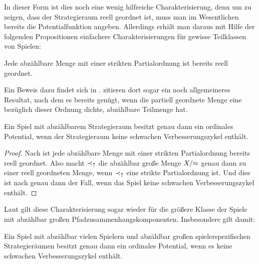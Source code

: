 In dieser Form ist dies noch eine wenig hilfreiche Charakterisierung, denn um zu zeigen, dass der Strategieraum reell geordnet ist, muss man im Wesentlichen bereits die Potentialfunktion angeben. Allerdings erhält man daraus mit Hilfe der folgenden Propositionen einfachere Charakterisierungen für gewisse Teilklassen von Spielen:

\begin{prop}\label{prop:AbzReellGeordnet}
	Jede abzählbare Menge mit einer strikten Partialordnung ist bereits reell geordnet.
\end{prop}

Ein Beweis dazu findet sich in \cite[Lemma 2.2]{CharExOrdPot}. \citeauthor{CharExOrdPot} zitieren dort sogar ein noch allgemeineres Resultat, nach dem es bereits genügt, wenn die partiell geordnete Menge eine bezüglich dieser Ordnung dichte, abzählbare Teilmenge hat.

\begin{kor}\label{kor:CharExOrdPotabzX}
	Ein Spiel mit abzählbarem Strategieraum besitzt genau dann ein ordinales Potential, wenn der Strategieraum keine schwachen Verbesserungszykel enthält.
\end{kor}

\begin{proof}
	Nach  ist jede abzählbare Menge mit einer strikten Partialordnung bereits reell geordnet. Also macht $\prec_\uparrow$ die abzählbar große Menge $X/{\approx}$ genau dann zu einer reell geordneten Menge, wenn $\prec_\uparrow$ eine strikte Partialordnung ist. Und dies ist nach  genau dann der Fall, wenn das Spiel keine schwachen Verbesserungszykel enthält.
\end{proof}

Laut  gilt diese Charakterisierung sogar wieder für die größere Klasse der Spiele mit abzählbar großen Pfadzusammenhangskomponenten. Insbesondere gilt damit:

\begin{kor}\label{kor:CharExOrdPotabzIundXi}
	Ein Spiel mit abzählbar vielen Spielern und abzählbar großen spielerspezifischen Strategieräumen besitzt genau dann ein ordinales Potential, wenn es keine schwachen Verbesserungszykel enthält.
\end{kor}

